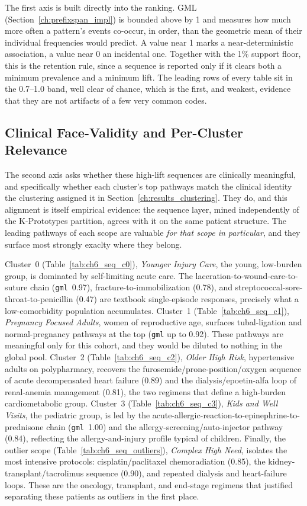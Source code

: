 The first axis is built directly into the ranking. GML (Section~\ref{ch:prefixspan_impl}) is bounded above by 1 and measures how much more often a pattern's events co-occur, in order, than the geometric mean of their individual frequencies would predict. A value near 1 marks a near-deterministic association, a value near 0 an incidental one. Together with the 1\% support floor, this is the retention rule, since a sequence is reported only if it clears both a minimum prevalence and a minimum lift. The leading rows of every table sit in the 0.7--1.0 band, well clear of chance, which is the first, and weakest, evidence that they are not artifacts of a few very common codes.

\subsection{Clinical Face-Validity and Per-Cluster Relevance}

The second axis asks whether these high-lift sequences are clinically meaningful, and specifically whether each cluster's top pathways match the clinical identity the clustering assigned it in Section~\ref{ch:results_clustering}. They do, and this alignment is itself empirical evidence: the sequence layer, mined independently of the K-Prototypes partition, agrees with it on the same patient structure. The leading pathways of each scope are valuable \emph{for that scope in particular}, and they surface most strongly exaclty where they belong.

Cluster~0 (Table~\ref{tab:ch6_seq_c0}), \emph{Younger Injury Care}, the young, low-burden group, is dominated by self-limiting acute care. The laceration-to-wound-care-to-suture chain (\texttt{gml}~0.97), fracture-to-immobilization (0.78), and streptococcal-sore-throat-to-penicillin (0.47) are textbook single-episode responses, precisely what a low-comorbidity population accumulates. Cluster~1 (Table~\ref{tab:ch6_seq_c1}), \emph{Pregnancy Focused Adults}, women of reproductive age, surfaces tubal-ligation and normal-pregnancy pathways at the top (\texttt{gml} up to 0.92). These pathways are meaningful only for this cohort, and they would be diluted to nothing in the global pool. Cluster~2 (Table~\ref{tab:ch6_seq_c2}), \emph{Older High Risk}, hypertensive adults on polypharmacy, recovers the furosemide/prone-position/oxygen sequence of acute decompensated heart failure (0.89) and the dialysis/epoetin-alfa loop of renal-anemia management (0.81), the two regimens that define a high-burden cardiometabolic group. Cluster~3 (Table~\ref{tab:ch6_seq_c3}), \emph{Kids and Well Visits}, the pediatric group, is led by the acute-allergic-reaction-to-epinephrine-to-prednisone chain (\texttt{gml}~1.00) and the allergy-screening/auto-injector pathway (0.84), reflecting the allergy-and-injury profile typical of children. Finally, the outlier scope (Table~\ref{tab:ch6_seq_outliers}), \emph{Complex High Need}, isolates the most intensive protocols: cisplatin/paclitaxel chemoradiation (0.85), the kidney-transplant/tacrolimus sequence (0.90), and repeated dialysis and heart-failure loops. These are the oncology, transplant, and end-stage regimens that justified separating these patients as outliers in the first place.

